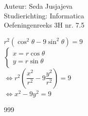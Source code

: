 \documentclass[a4paper]{article}
\begin{document}
\noindent \large Auteur: Seda Jusjajeva\\
\noindent \large Studierichting: Informatica\\
\noindent \large Oefeningenreeks 3H nr. 7.5 \\

\medskip

\normalsize

$r^2(\cos^2\theta - 9\sin^2\theta) = 9$ \\

$\left \{
	\begin{array}{l}
		x = r\cos\theta\\
		y = r\sin\theta
	\end{array}
\right .$ \\

$\Leftrightarrow r^2\left(\dfrac{x^2}{r^2} - 9\dfrac{y^2}{r^2}\right) = 9$ \\

$\Leftrightarrow x^2 - 9y^2 = 9$ \\



\begin{thebibliography}{999}
\end{thebibliography}
\end{document}
